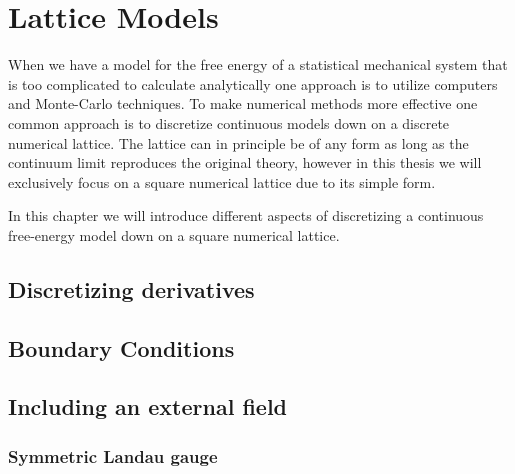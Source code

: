 \chapter{Lattice Models}

When we have a model for the free energy of a statistical mechanical system that is too complicated to
calculate analytically one approach is to utilize computers and Monte-Carlo techniques. To make numerical
methods more effective one common approach is to discretize continuous models down on a discrete
numerical lattice. The lattice can in principle be of any form as long as the continuum limit reproduces
the original theory, however in this thesis we will exclusively focus on a square numerical lattice
due to its simple form.

In this chapter we will introduce different aspects of discretizing a continuous free-energy model down
on a square numerical lattice.

\section{Discretizing derivatives}


\section{Boundary Conditions}

\section{Including an external field}

\subsection{Symmetric Landau gauge}
